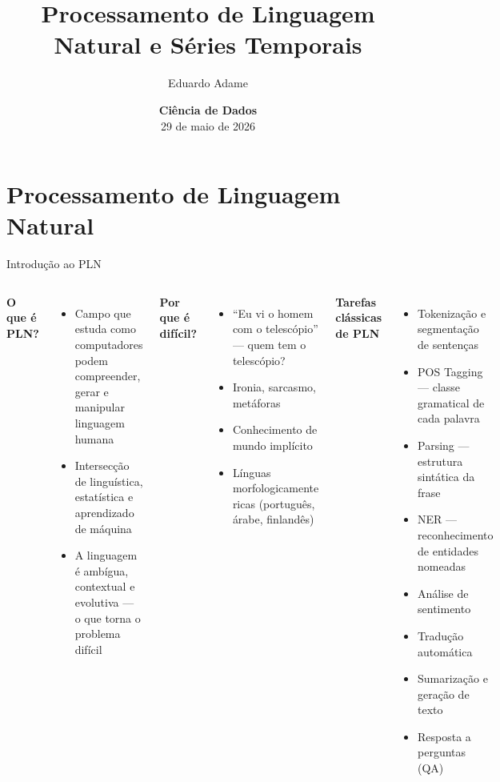 \documentclass[xcolor=dvipsnames,t,aspectratio=169]{beamer}
\title{Processamento de Linguagem Natural e Séries Temporais}
\author{Eduardo Adame}
\date{{\color{nes_dark_purple}\textbf{Ciência de Dados}\\[0.5em] 29 de maio de 2026 }}
\newcommand{\highlight}[1]{{\color{nes_dark_orange} #1}}
\begin{document}
\frame[plain]{\titlepage}
\setcounter{framenumber}{0}


\section{Processamento de Linguagem Natural}

\begin{frame}[c]{Introdução ao PLN}

\begin{columns}
\textbf{\color{nes_dark_purple}O que é PLN?}
\begin{itemize}
    \item Campo que estuda como computadores podem \highlight{compreender, gerar e manipular} linguagem humana
    \item Intersecção de linguística, estatística e aprendizado de máquina
    \item A linguagem é \highlight{ambígua, contextual e evolutiva} — o que torna o problema difícil
\end{itemize}

\textbf{\color{nes_dark_purple}Por que é difícil?}
\begin{itemize}
    \item ``Eu vi o homem com o telescópio'' — quem tem o telescópio?
    \item Ironia, sarcasmo, metáforas
    \item Conhecimento de mundo implícito
    \item Línguas morfologicamente ricas (português, árabe, finlandês)
\end{itemize}

\textbf{\color{nes_dark_purple}Tarefas clássicas de PLN}
\begin{itemize}
    \item \highlight{Tokenização e segmentação} de sentenças
    \item \highlight{POS Tagging} — classe gramatical de cada palavra
    \item \highlight{Parsing} — estrutura sintática da frase
    \item \highlight{NER} — reconhecimento de entidades nomeadas
    \item \highlight{Análise de sentimento}
    \item \highlight{Tradução automática}
    \item \highlight{Sumarização} e geração de texto
    \item \highlight{Resposta a perguntas} (QA)
\end{itemize}
\end{columns}

\end{frame}
\end{document}
